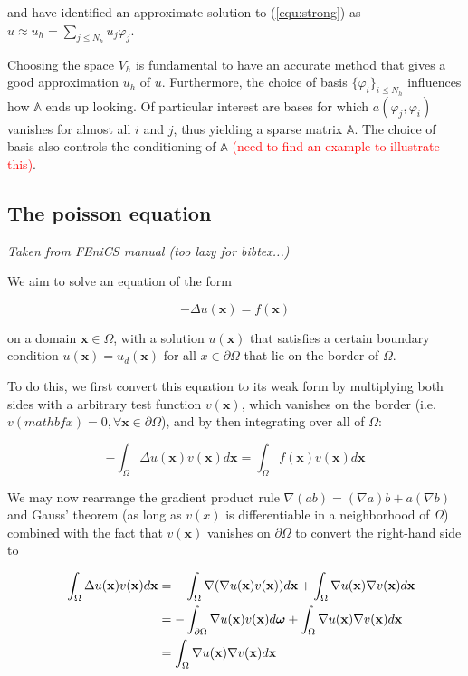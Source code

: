 \documentclass[11pt, a4paper]{article}
\begin{document}
and have identified an approximate solution to (\ref{equ:strong}) as
$u \approx u_h = \sum_{j \leq N_h} u_j \varphi_j$.

Choosing the space $V_h$ is fundamental to have an accurate method that 
gives a good approximation $u_h$ of $u$. Furthermore, the choice of basis 
$\{\varphi_i\}_{i \leq N_h}$ influences how $\mathbb{A}$ ends up looking.
Of particular interest are bases for which $a(\varphi_j, \varphi_i)$ vanishes 
for almost all $i$ and $j$, thus yielding a sparse matrix $\mathbb{A}$. The
choice of basis also controls the conditioning of $\mathbb{A}$
\textcolor{red}{(need to find an example to illustrate this)}.

\subsection{The poisson equation}
\label{subsec:poisson}

\textit{Taken from FEniCS manual (too lazy for bibtex...)}

We aim to solve an equation of the form

\begin{equation}
    - \Delta u(\mathbf{x}) = f(\mathbf{x}) \label{equ:poisson}
\end{equation}

on a domain $\mathbf{x} \in \Omega$, with a solution $u(\mathbf{x})$
that satisfies a certain boundary condition $u(\mathbf{x}) = u_d(\mathbf{x})$
for all $x \in \partial \Omega$ that lie on the border of $\Omega$.

To do this, we first convert this equation to its weak form
by multiplying both sides with a arbitrary test function
$v(\mathbf{x})$, which vanishes on the border (i.e. $v(mathbf{x}) = 0, \forall
\mathbf{x} \in \partial \Omega$), and by then integrating over all of $\Omega$:

\begin{equation}
    - \int_{\Omega} \Delta u(\mathbf{x}) v(\mathbf{x}) d\mathbf{x} = \int_{\Omega} f(\mathbf{x}) v(\mathbf{x}) d\mathbf{x} 
\end{equation}

We may now rearrange the gradient product rule $\nabla (a b) = (\nabla a) b + a (\nabla b)$ and
Gauss' theorem (as long as $v(x)$ is differentiable in a neighborhood of $\Omega$)
combined with the fact that $v(\mathbf{x})$ vanishes on $\partial
\Omega$ to convert the right-hand side to

\begin{align}
    - \int_{\Omega} \Delta u(\mathbf{x}) v(\mathbf{x}) d\mathbf{x} &= - \int_{\Omega} \nabla ( \nabla u(\mathbf{x}) v(\mathbf{x}) ) d\mathbf{x} + \int_{\Omega} \nabla u(\mathbf{x}) \nabla v(\mathbf{x}) d\mathbf{x} \notag \\ 
    &= - \int_{\partial \Omega} \nabla u(\mathbf{x}) v(\mathbf{x}) d\boldsymbol{\omega} + \int_{\Omega} \nabla u(\mathbf{x}) \nabla v(\mathbf{x}) d\mathbf{x} \notag \\ 
    &= \int_{\Omega} \nabla u(\mathbf{x}) \nabla v(\mathbf{x}) d\mathbf{x}
\end{align}
\end{document}

